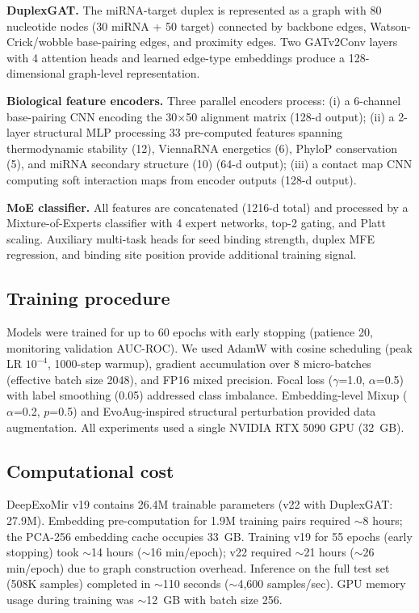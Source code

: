 \documentclass[unnumsec,webpdf,contemporary,large]{oup-authoring-template}
\begin{document}
\textbf{DuplexGAT.} The miRNA-target duplex is represented as a graph with 80 nucleotide nodes (30 miRNA + 50 target) connected by backbone edges, Watson-Crick/wobble base-pairing edges, and proximity edges. Two GATv2Conv layers \citep{brody2022} with 4 attention heads and learned edge-type embeddings produce a 128-dimensional graph-level representation.

\textbf{Biological feature encoders.} Three parallel encoders process: (i) a 6-channel base-pairing CNN encoding the 30$\times$50 alignment matrix (128-d output); (ii) a 2-layer structural MLP processing 33 pre-computed features spanning thermodynamic stability (12), ViennaRNA energetics (6), PhyloP conservation (5), and miRNA secondary structure (10) (64-d output); (iii) a contact map CNN computing soft interaction maps from encoder outputs (128-d output).

\textbf{MoE classifier.} All features are concatenated (1216-d total) and processed by a Mixture-of-Experts classifier with 4 expert networks, top-2 gating, and Platt scaling. Auxiliary multi-task heads for seed binding strength, duplex MFE regression, and binding site position provide additional training signal.

\subsection{Training procedure}

Models were trained for up to 60 epochs with early stopping (patience 20, monitoring validation AUC-ROC). We used AdamW with cosine scheduling (peak LR $10^{-4}$, 1000-step warmup), gradient accumulation over 8 micro-batches (effective batch size 2048), and FP16 mixed precision. Focal loss ($\gamma$=1.0, $\alpha$=0.5) with label smoothing (0.05) addressed class imbalance. Embedding-level Mixup ($\alpha$=0.2, $p$=0.5) and EvoAug-inspired structural perturbation \citep{bommasani2021} provided data augmentation. All experiments used a single NVIDIA RTX 5090 GPU (32~GB).

\subsection{Computational cost}

DeepExoMir v19 contains 26.4M trainable parameters (v22 with DuplexGAT: 27.9M). Embedding pre-computation for 1.9M training pairs required $\sim$8 hours; the PCA-256 embedding cache occupies 33~GB. Training v19 for 55 epochs (early stopping) took $\sim$14 hours ($\sim$16 min/epoch); v22 required $\sim$21 hours ($\sim$26 min/epoch) due to graph construction overhead. Inference on the full test set (508K samples) completed in $\sim$110 seconds ($\sim$4,600 samples/sec). GPU memory usage during training was $\sim$12~GB with batch size 256.
\end{document}
